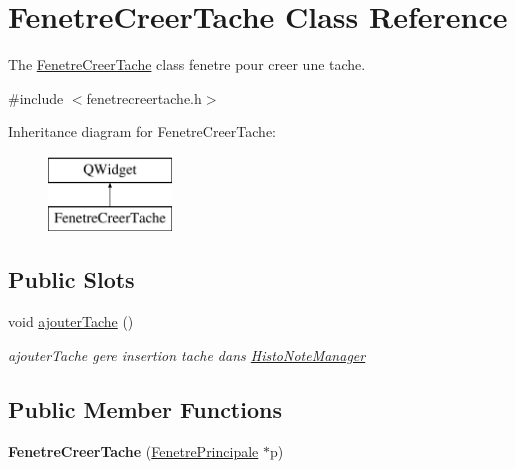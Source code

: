 \hypertarget{class_fenetre_creer_tache}{}\section{Fenetre\+Creer\+Tache Class Reference}
\label{class_fenetre_creer_tache}


The \hyperlink{class_fenetre_creer_tache}{Fenetre\+Creer\+Tache} class fenetre pour creer une tache.  




{\ttfamily \#include $<$fenetrecreertache.\+h$>$}

Inheritance diagram for Fenetre\+Creer\+Tache\+:\begin{figure}[H]
\begin{center}
\leavevmode
\includegraphics[height=2.000000cm]{class_fenetre_creer_tache}
\end{center}
\end{figure}
\subsection*{Public Slots}
\begin{DoxyCompactItemize}
\item 
\mbox{\label{class_fenetre_creer_tache_aedd811e90cb80f2f8c8509b313884be0}} 
void \hyperlink{class_fenetre_creer_tache_aedd811e90cb80f2f8c8509b313884be0}{ajouter\+Tache} ()
\begin{DoxyCompactList}\small\item\em ajouter\+Tache gere insertion tache dans \hyperlink{class_histo_note_manager}{Histo\+Note\+Manager} \end{DoxyCompactList}\end{DoxyCompactItemize}
\subsection*{Public Member Functions}
\begin{DoxyCompactItemize}
\item 
\mbox{\label{class_fenetre_creer_tache_ac1c51570b4c20c80fb9be43c8ce708b0}} 
{\bfseries Fenetre\+Creer\+Tache} (\hyperlink{class_fenetre_principale}{Fenetre\+Principale} $\ast$p)
\end{DoxyCompactItemize}


